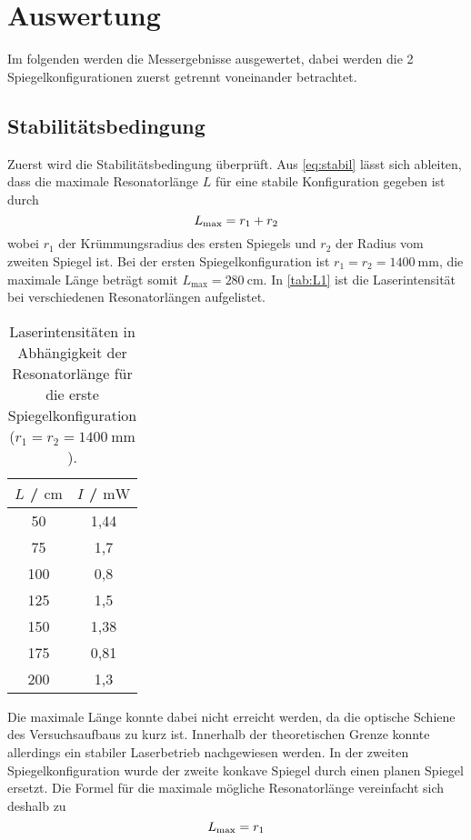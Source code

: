 \section{Auswertung}
\label{sec:Auswertung}
Im folgenden werden die Messergebnisse ausgewertet, dabei werden die 2 Spiegelkonfigurationen zuerst getrennt
voneinander betrachtet.

\subsection{Stabilitätsbedingung}
Zuerst wird die Stabilitätsbedingung überprüft.
Aus \eqref{eq:stabil} lässt sich ableiten, dass die maximale Resonatorlänge $L$ für eine
stabile Konfiguration gegeben ist durch
\begin{equation}
  \notag
  L_\text{max} = r_1 + r_2
\end{equation}
wobei $r_1$ der Krümmungsradius des ersten Spiegels und $r_2$ der Radius vom zweiten Spiegel ist.
Bei der ersten Spiegelkonfiguration ist $r_1=r_2=\qty{1400}{\milli\metre}$, die maximale Länge beträgt
somit $L_\text{max} = \qty{280}{\centi\metre}$. 
In \autoref{tab:L1} ist die Laserintensität bei verschiedenen Resonatorlängen aufgelistet.
\begin{table}[H]
  \centering
  \begin{tabular}{c|c}
    {$L$ / $\unit{\centi\metre}$} & {$I$ / $\unit{\milli\watt}$} \\
    \hline
    50  & 1,44  \\
    75  & 1,7  \\
    100  & 0,8  \\
    125  & 1,5  \\
    150  & 1,38  \\
    175  & 0,81   \\
    200  & 1,3 
  \end{tabular}
  \caption{Laserintensitäten in Abhängigkeit der Resonatorlänge für die erste Spiegelkonfiguration ($r_1=r_2=\qty{1400}{\milli\metre}$).}
  \label{tab:L1}
\end{table}
Die maximale Länge konnte dabei nicht erreicht werden, da die optische Schiene des Versuchsaufbaus zu kurz ist.
Innerhalb der theoretischen Grenze konnte allerdings ein stabiler Laserbetrieb nachgewiesen werden.
In der zweiten Spiegelkonfiguration wurde der zweite konkave Spiegel durch einen planen Spiegel ersetzt.
Die Formel für die maximale mögliche Resonatorlänge vereinfacht sich deshalb zu
\begin{equation}
  \notag
  L_\text{max} = r_1
\end{equation}
